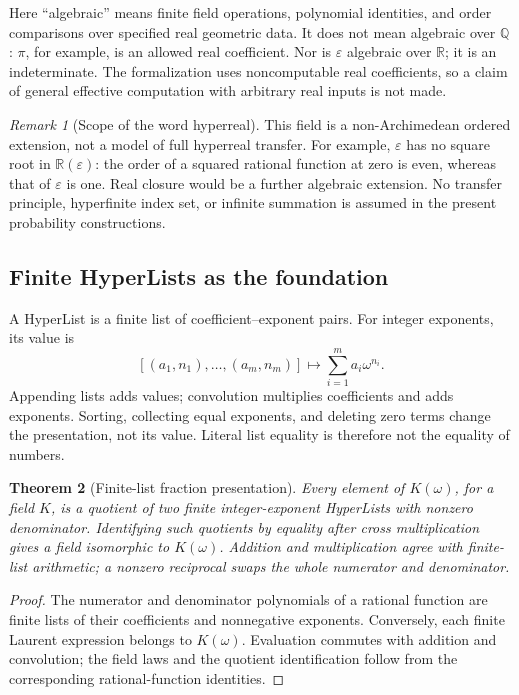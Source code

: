 \documentclass[11pt]{article}
\newtheorem{theorem}{Theorem}[section]
\theoremstyle{definition}
\theoremstyle{remark}
\newtheorem{remark}[theorem]{Remark}
\newcommand{\R}{\mathbb R}
\newcommand{\eps}{\varepsilon}
\begin{document}
Here ``algebraic'' means finite field operations, polynomial identities,
and order comparisons over specified real geometric data. It does not mean
algebraic over $\mathbb Q$: $\pi$, for example, is an allowed real
coefficient. Nor is $\eps$ algebraic over $\R$; it is an indeterminate.
The formalization uses noncomputable real coefficients, so a claim of
general effective computation with arbitrary real inputs is not made.

\begin{remark}[Scope of the word hyperreal]
This field is a non-Archimedean ordered extension, not a model of full
hyperreal transfer. For example, $\eps$ has no square root in $\R(\eps)$:
the order of a squared rational function at zero is even, whereas that of
$\eps$ is one. Real closure would be a further algebraic extension.
No transfer principle, hyperfinite index set, or infinite summation is
assumed in the present probability constructions.
\end{remark}

\subsection{Finite HyperLists as the foundation}
A HyperList is a finite list of coefficient--exponent pairs. For integer
exponents, its value is
\[
 [(a_1,n_1),\ldots,(a_m,n_m)]\longmapsto
 \sum_{i=1}^m a_i\omega^{n_i}.
\]
Appending lists adds values; convolution multiplies coefficients and adds
exponents. Sorting, collecting equal exponents, and deleting zero terms
change the presentation, not its value. Literal list equality is therefore
not the equality of numbers.

\begin{theorem}[Finite-list fraction presentation]
Every element of $K(\omega)$, for a field $K$, is a quotient of two finite
integer-exponent HyperLists with nonzero denominator. Identifying such
quotients by equality after cross multiplication gives a field isomorphic
to $K(\omega)$. Addition and multiplication agree with finite-list
arithmetic; a nonzero reciprocal swaps the whole numerator and denominator.
\end{theorem}
\begin{proof}
The numerator and denominator polynomials of a rational function are finite
lists of their coefficients and nonnegative exponents. Conversely, each
finite Laurent expression belongs to $K(\omega)$. Evaluation commutes with
addition and convolution; the field laws and the quotient identification
follow from the corresponding rational-function identities.
\end{proof}
\end{document}
